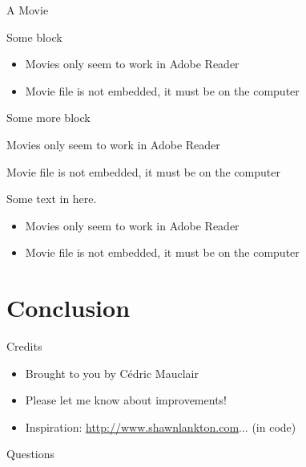 \documentclass[utf8, a4paper]{beamer}
\begin{document}
\begin{frame}
  {A Movie}

  \begin{block}
    {Some block}

    \begin{itemize}
    \item Movies only seem to work in Adobe Reader
    \item Movie file is not embedded, it must be on the computer
    \end{itemize}
  \end{block}

  \begin{exampleblock}
    {Some more block}

    Movies only seem to work in Adobe Reader\par
    Movie file is not embedded, it must be on the computer
  \end{exampleblock}

  \begin{alertblock}

    Some text in here.

    \begin{itemize}
    \item Movies only seem to work in Adobe Reader
    \item Movie file is not embedded, it must be on the computer
    \end{itemize}
  \end{alertblock}
\end{frame}


\section
  {Conclusion}

\begin{frame}
  {Credits}

  \begin{itemize}
  \item Brought to you by Cédric Mauclair
  \item Please let me know about improvements!
  \item Inspiration: \url{http://www.shawnlankton.com}... (in code)
  \end{itemize}
\end{frame}


\begin{frame}
  {Questions}

  \nocite{lorem,ipsum}
  
  

\end{frame}
\end{document}

